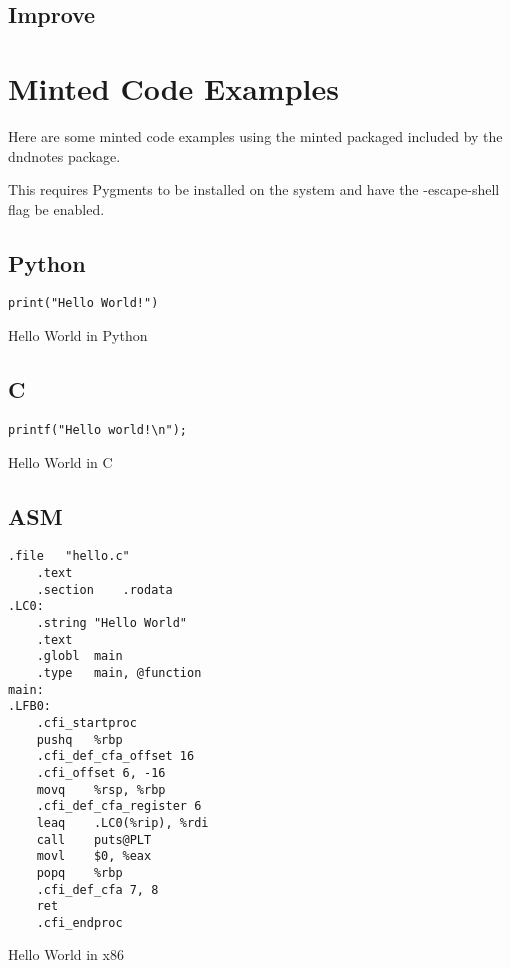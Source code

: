 \documentclass[letterpaper,10pt,twoside,onecolumn,openany,draft]{book}
\begin{document}
\section{Improve}
\lipsum[4][1-5]
\lipsum[4][6-10]

\chapter{Minted Code Examples}
Here are some minted code examples using the minted packaged included by the dndnotes package.
\begin{Note}
  This requires Pygments to be installed on the system and have the -escape-shell flag be enabled.
\end{Note}
\section{Python}
\begin{listing}[h]
\begin{verbatim}
print("Hello World!")
\end{verbatim}
\caption{Hello World in Python}
\label{lst:hello_world_in_python}
\end{listing}

\section{C}
\begin{listing}[h]
\begin{verbatim}
printf("Hello world!\n");
\end{verbatim}
\caption{Hello World in C}
\label{lst:hello_world_in_c}
\end{listing}

\section{ASM}
\begin{listing}[h]
\begin{verbatim}
.file	"hello.c"
	.text
	.section	.rodata
.LC0:
	.string	"Hello World"
	.text
	.globl	main
	.type	main, @function
main:
.LFB0:
	.cfi_startproc
	pushq	%rbp
	.cfi_def_cfa_offset 16
	.cfi_offset 6, -16
	movq	%rsp, %rbp
	.cfi_def_cfa_register 6
	leaq	.LC0(%rip), %rdi
	call	puts@PLT
	movl	$0, %eax
	popq	%rbp
	.cfi_def_cfa 7, 8
	ret
	.cfi_endproc
\end{verbatim}
\caption{Hello World in x86}
\label{lst:hello_world_in_x86}
\end{listing}
\end{document}
